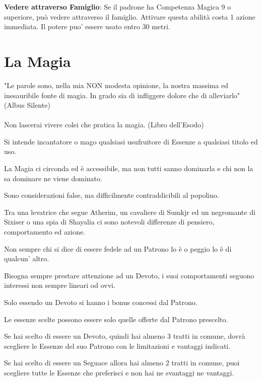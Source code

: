 \documentclass[a4paper,11pt,twoside,openany]{book}
\begin{document}
\textbf{Vedere attraverso Famiglio}: Se il padrone ha Competenza Magica 9 o superiore, può vedere attraverso il famiglio. Attivare questa abilità costa 1 azione immediata. Il potere puo' essere usato entro 30 metri.

\pagebreak

\section{La Magia}

\label{la-magia}
\begin{tcolorbox}[enhanced,arc=5pt,boxrule=0.3pt]{
	"Le parole sono, nella mia NON modesta opinione, la nostra massima ed inesauribile fonte di magia. In grado sia di infliggere dolore che di alleviarlo" (Albus Silente)\\\\
	Non lascerai vivere colei che pratica la magia. (Libro dell'Esodo)} \end{tcolorbox} \medskip

Si intende incantatore o mago qualsiasi usufruitore di Essenze a qualsiasi titolo ed uso.

La Magia ci circonda ed è accessibile, ma non tutti sanno dominarla e chi non la sa dominare ne viene dominato.

Sono considerazioni false, ma difficilmente contraddicibili al popolino.

Tra una levatrice che segue Atherim, un cavaliere di Sumkjr ed un negromante di Sixiser o una spia di Shayalia ci sono notevoli differenze di pensiero, comportamento ed azione.

Non sempre chi si dice di essere fedele ad un Patrono lo è o peggio lo è di qualcun' altro.

Bisogna sempre prestare attenzione ad un Devoto, i suoi comportamenti seguono interessi non sempre lineari od ovvi.

Solo essendo un Devoto si hanno i bonus concessi dal Patrono. 

Le essenze scelte possono essere solo quelle offerte dal Patrono prescelto.

Se hai scelto di essere un Devoto, quindi hai almeno 3 tratti in comune, dovrà scegliere le Essenze del suo Patrono con le limitazioni e vantaggi indicati.

Se hai scelto di essere un Seguace allora hai almeno 2 tratti in comune, puoi scegliere tutte le Essenze che preferisci e non hai ne svantaggi ne vantaggi.
\end{document}

